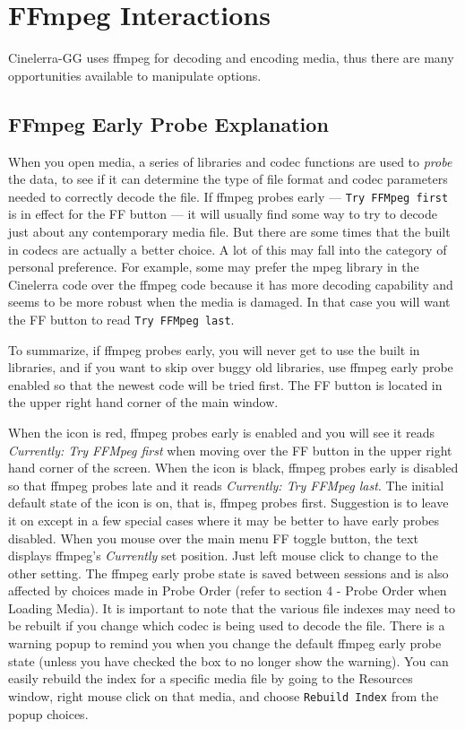 \chapter{FFmpeg Interactions}%
\label{cha:ffmpeg_interactions}

Cinelerra-GG uses ffmpeg for decoding and encoding media, thus there are many opportunities available to manipulate options.

\section{FFmpeg Early Probe Explanation}%
\label{sec:ffmpeg_early_probe_explanation}

When you open media, a series of libraries and codec functions are used to \textit{probe} the data, to see if it can determine the type of file format and codec parameters needed to correctly decode the file.  If ffmpeg probes early --- \texttt{Try FFMpeg first} is in effect for the FF button --- it will usually find some way to try to decode just about any contemporary media file.  But there are some times that the built in codecs are actually a better choice.  A lot of this may fall into the category of personal preference.  For example, some may prefer the mpeg library in the Cinelerra code over the ffmpeg code because it has more decoding capability and seems to be more robust when the media is damaged.  In that case you will want the FF button to read \texttt{Try FFMpeg last}.

To summarize, if ffmpeg probes early, you will never get to use the built in libraries, and if you want to skip over buggy old libraries, use ffmpeg early probe enabled so that the newest code will be tried first.
The FF button is located in the upper right hand corner of the main window.

When the icon is red, ffmpeg probes early is enabled and you will see it reads
 \textit{Currently: Try FFMpeg first} when moving over the FF button in the upper 
right hand corner of the screen.  When the icon is black, ffmpeg probes early is disabled so that 
ffmpeg probes late and it reads \textit{Currently: Try FFMpeg last}.  The initial default state of 
the icon is on, that is, ffmpeg probes first. Suggestion is to leave it on except in a few special 
cases where it may be better to have early probes disabled.  When you mouse over the main menu FF 
toggle button, the text displays ffmpeg's \textit{Currently} set position.  Just left mouse click to change to the other setting.
The ffmpeg early probe state is saved between sessions and is also affected by choices made in Probe Order (refer to section 4 - Probe Order when Loading Media). It is important to note that the various file indexes may need to be rebuilt if you change which codec is being used to decode the file.  There is a warning popup to remind you when you change the default ffmpeg early probe state (unless you have checked the box to no longer show the warning).  You can easily rebuild the index for a specific media file by going to the Resources window, right mouse click on that media, and choose \texttt{Rebuild Index} from the popup choices.

